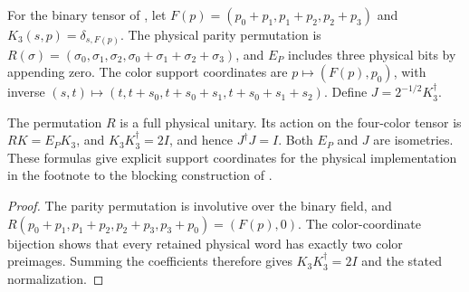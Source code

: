 \begin{definition}
    \label{def:peps_kitaev_physical_support}
    \leanok
    For the binary tensor of \cite[Section~7]{Schuch2010PEPS}, let
    $F(p)=(p_0+p_1,p_1+p_2,p_2+p_3)$ and
    $K_3(s,p)=\delta_{s,F(p)}$. The physical parity permutation is
    $R(\sigma)=(\sigma_0,\sigma_1,\sigma_2,
        \sigma_0+\sigma_1+\sigma_2+\sigma_3)$, and $E_P$ includes three physical
    bits by appending zero. The color support coordinates are
    $p\mapsto(F(p),p_0)$, with inverse
    $(s,t)\mapsto(t,t+s_0,t+s_0+s_1,t+s_0+s_1+s_2)$.
    Define $J=2^{-1/2}K_3^\dagger$.
\end{definition}

\begin{lemma}
    \label{thm:peps_kitaev_physical_support}
    \leanok
    The permutation $R$ is a full physical unitary. Its action on the
    four-color tensor is $RK=E_PK_3$, and
    $K_3K_3^\dagger=2I$, and hence $J^\dagger J=I$.
    Both $E_P$ and $J$ are isometries. These formulas give explicit support
    coordinates for the physical implementation in the footnote to the blocking
    construction of \cite[Section~7]{Schuch2010PEPS}.
\end{lemma}
\begin{proof}
    \leanok
    The parity permutation is involutive over the binary field, and
    $R(p_0+p_1,p_1+p_2,p_2+p_3,p_3+p_0)=(F(p),0)$.
    The color-coordinate bijection shows that every retained physical word has
    exactly two color preimages. Summing the coefficients therefore gives
    $K_3K_3^\dagger=2I$ and the stated normalization.
\end{proof}

